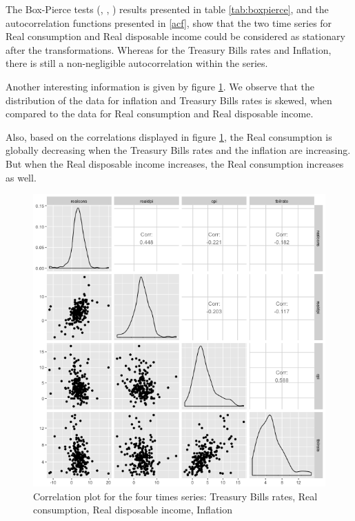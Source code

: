 The Box-Pierce tests (\cite{box1970distribution}, \cite{ljung1978measure}, \cite{harvey1993time}) results presented in table \ref{tab:boxpierce}, and the autocorrelation functions presented in \ref{acf}, show that the two time series for Real consumption and Real disposable income could be considered as stationary after the transformations. Whereas for the Treasury Bills rates and Inflation, there is still a non-negligible autocorrelation within the series.

\medskip

Another interesting information is given by figure \ref{corrplot}. We observe that the distribution of the data for inflation and Treasury Bills rates is skewed, when compared to the data for Real consumption and Real disposable income.

\medskip

Also, based on the correlations displayed in figure \ref{corrplot}, the Real consumption is globally  decreasing when the Treasury Bills rates and the inflation are increasing. But when the Real disposable income increases, the Real consumption increases as well.

\begin{figure}[!htb]
\centering
\includegraphics[width=14cm]{gfx/chapter-rvfl-ensembles/scatterplot.png}
\caption{Correlation plot for the four times series: Treasury Bills rates, Real consumption, Real disposable income, Inflation}
\label{corrplot}
\end{figure}

